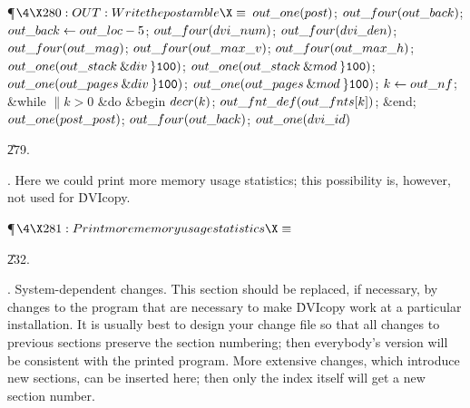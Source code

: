 \Y\P$\4\X280:OUT: Write the postamble\X\S$\6
$\\{out\_one}(\\{post})$;\5
$\\{out\_four}(\\{out\_back})$;\5
$\\{out\_back}\K\\{out\_loc}-5$;\6
$\\{out\_four}(\\{dvi\_num})$;\5
$\\{out\_four}(\\{dvi\_den})$;\5
$\\{out\_four}(\\{out\_mag})$;\6
$\\{out\_four}(\\{out\_max\_v})$;\5
$\\{out\_four}(\\{out\_max\_h})$;\6
$\\{out\_one}(\\{out\_stack}\mathbin{\&{div}}\H{100})$;\5
$\\{out\_one}(\\{out\_stack}\mathbin{\&{mod}}\H{100})$;\6
$\\{out\_one}(\\{out\_pages}\mathbin{\&{div}}\H{100})$;\5
$\\{out\_one}(\\{out\_pages}\mathbin{\&{mod}}\H{100})$;\6
$\|k\K\\{out\_nf}$;\6
\&{while} $\|k>0$ \1\&{do}\6
\&{begin} $\\{decr}(\|k)$;\5
$\\{out\_fnt\_def}(\\{out\_fnts}[\|k])$;\6
\&{end};\2\6
$\\{out\_one}(\\{post\_post})$;\5
$\\{out\_four}(\\{out\_back})$;\6
$\\{out\_one}(\\{dvi\_id})$\par
\U279.\fi

. Here we could print more memory usage statistics; this possibility is,
however, not used for \.{DVIcopy}.

\Y\P$\4\X281:Print more memory usage statistics\X\S$\par
\U232.\fi

.  System-dependent changes.
This section should be replaced, if necessary, by changes to the program
that are necessary to make \.{DVIcopy} work at a particular installation.
It is usually best to design your change file so that all changes to
previous sections preserve the section numbering; then everybody's version
will be consistent with the printed program. More extensive changes,
which introduce new sections, can be inserted here; then only the index
itself will get a new section number.

